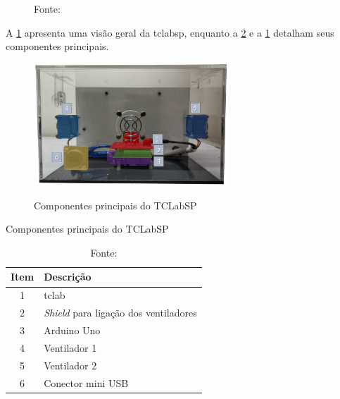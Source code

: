 \begin{figure}[h]
\begin{minipage}{0.47\textwidth}
	\end{minipage}
	\label{fig:tclabsp}		      
	Fonte: 
\end{figure}

A \cref{fig:tclabsp} apresenta uma visão geral da \acrshort{tclabsp}, enquanto a \cref{fig:tclabsp_color}
e a \cref{tab:componentes_tclabsp} detalham seus componentes principais.

\begin{figure}[h]
	\caption{Componentes principais do TCLabSP}
	\begin{center}
		\includegraphics[width=0.65\textwidth]{./5_images/TCLabSP_color_numbers.png} 
		\label{fig:tclabsp_color}
	\end{center}
	\centering
\end{figure}

\begin{table}[!h]
	\centering
	\caption{Componentes principais do TCLabSP}
	\label{tab:componentes_tclabsp}
	\begin{tabular}{cl} \toprule
		{Item}			& {Descrição} 										\\ \midrule
		1		 		& \acrshort{tclab}	 								\\
		2				& \textit{Shield} para ligação dos ventiladores		\\
		3				& Arduino Uno										\\
		4				& Ventilador 1										\\
		5				& Ventilador 2										\\
		6				& Conector mini USB									\\ \bottomrule
	\end{tabular}
	\caption*{Fonte: }
\end{table}

